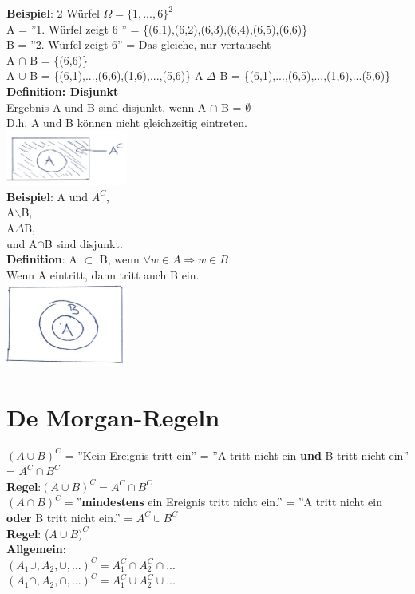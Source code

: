 \textbf{Beispiel}: 2 Würfel $\Omega = \{1,...,6\}^2$\\
A = ''1. Würfel zeigt 6 '' = \{(6,1),(6,2),(6,3),(6,4),(6,5),(6,6)\}\\
B = ''2. Würfel zeigt 6'' = Das gleiche, nur vertauscht\medskip\\
A $\cap$ B = \{(6,6)\}\\
A $\cup$ B = \{(6,1),...,(6,6),(1,6),...,(5,6)\}
A $\Delta$ B = \{(6,1),...,(6,5),...,(1,6),...(5,6)\}\newpage
\textbf{Definition: Disjunkt}\\
Ergebnis A und B sind disjunkt, wenn A $\cap$ B = $\emptyset$\\D.h. A und B können nicht gleichzeitig eintreten.\\\includegraphics[width=0.3\textwidth]{img/komplement.PNG}\medskip\\
\textbf{Beispiel}: A und $A^C$,\\ A$\backslash$B,\\ A$\Delta$B,\\ und A$\cap$B sind disjunkt.\medskip\\
\textbf{Definition}: A $\subset$ B, wenn $\forall w \in A \Rightarrow w \in B$\\Wenn A eintritt, dann tritt auch B ein.\\\includegraphics[width=0.3\textwidth]{img/subset.PNG}\medskip\\
\section{De Morgan-Regeln}
$\left( A \cup B\right)^C$ = ''Kein Ereignis tritt ein'' = ''A tritt nicht ein \textbf{und} B tritt nicht ein'' = $A^C \cap B^C$\\
\textbf{Regel}:$(A\cup B)^C = A^C \cap B^C$\medskip\\
$(A \cap B)^C =$''\textbf{mindestens} ein Ereignis tritt nicht ein.'' = ''A tritt nicht ein \textbf{oder} B tritt nicht ein.'' = $A^C\cup B^C$\medskip\\
\textbf{Regel}: ($A\cup B)^C$\\
\textbf{Allgemein}: \\$(A_1\cup,A_2,\cup,...)^C = A_1^C\cap A_2^C\cap...$\\
$(A_1\cap,A_2,\cap,...)^C = A_1^C\cup A_2^C\cup...$
